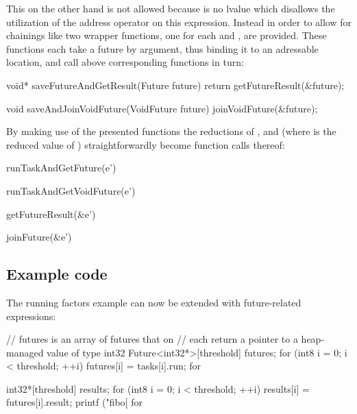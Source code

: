 This on the other hand is not allowed because  is no lvalue\cite[pp.~147-148]{CPrimerPlus} which disallows the utilization of the address operator on this expression. Instead in order to allow for chainings like  two wrapper functions, one for each  and , are provided. These functions each take a future by argument, thus binding it to an adressable location, and call above corresponding functions in turn:
\begin{ccode}
void* saveFutureAndGetResult(Future future) { 
  return getFutureResult(&future); 
}

void saveAndJoinVoidFuture(VoidFuture future) { 
  joinVoidFuture(&future); 
}
\end{ccode}

By making use of the presented functions the reductions of ,  and  (where  is the reduced value of ) straightforwardly become function calls thereof:

\begin{minipage}{0.5\textwidth}
\begin{ccode}
runTaskAndGetFuture(e')
\end{ccode}
\end{minipage}
\begin{minipage}{0.5\textwidth}
\begin{ccode}
runTaskAndGetVoidFuture(e')
\end{ccode}
\end{minipage}

\begin{minipage}{0.5\textwidth}
\begin{ccode}
getFutureResult(&e')
\end{ccode}
\end{minipage}
\begin{minipage}{0.5\textwidth}
\begin{ccode}
joinFuture(&e')
\end{ccode}
\end{minipage}

\subsection{Example code}
The running factors example can now be extended with future-related expressions:
\begin{ccode}
// futures is an array of futures that on 
// each return a pointer to a heap-managed value of type int32
Future<int32*>[threshold] futures; 
for (int8 i = 0; i < threshold; ++i) { 
  futures[i] = tasks[i].run; 
} for 
 
int32*[threshold] results; 
for (int8 i = 0; i < threshold; ++i) { 
  results[i] = futures[i].result; 
  printf ("fibo[%
} for
\end{ccode}

